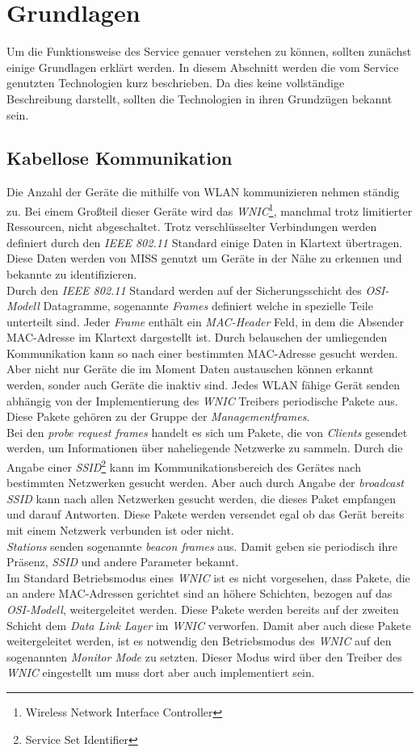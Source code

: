 \documentclass[]{report}
\begin{document}
\chapter{Grundlagen}
Um die Funktionsweise des Service genauer verstehen zu können, sollten zunächst einige Grundlagen erklärt werden. In diesem Abschnitt werden die vom Service genutzten Technologien kurz beschrieben. Da dies keine vollständige Beschreibung darstellt, sollten die Technologien in ihren Grundzügen bekannt sein. 
\section{Kabellose Kommunikation}
Die Anzahl der Geräte die mithilfe von WLAN kommunizieren nehmen ständig zu. Bei einem Großteil dieser Geräte wird das \textit{WNIC}\footnote{Wireless Network Interface Controller}, manchmal trotz limitierter Ressourcen, nicht abgeschaltet. Trotz verschlüsselter Verbindungen werden definiert durch den \textit{IEEE 802.11} Standard einige Daten in Klartext übertragen. Diese Daten werden von MISS genutzt um Geräte in der Nähe zu erkennen und bekannte zu identifizieren. \\
Durch den \textit{IEEE 802.11} Standard werden auf der Sicherungsschicht des \textit{OSI-Modell} Datagramme, sogenannte \textit{Frames} definiert welche in spezielle Teile unterteilt sind. Jeder \textit{Frame} enthält ein \textit{MAC-Header} Feld, in dem die Absender MAC-Adresse im Klartext dargestellt ist. Durch belauschen der umliegenden Kommunikation kann so nach einer bestimmten MAC-Adresse gesucht werden. \\
Aber nicht nur Geräte die im Moment Daten austauschen können erkannt werden, sonder auch Geräte die inaktiv sind. Jedes WLAN fähige Gerät senden abhängig von der Implementierung des \textit{WNIC} Treibers periodische Pakete aus. Diese Pakete gehören zu der Gruppe der \textit{Managementframes}. \\
Bei den \textit{probe request frames} handelt es sich um Pakete, die von \textit{Clients} gesendet werden, um Informationen über naheliegende Netzwerke zu sammeln. Durch die Angabe einer \textit{SSID}\footnote{Service Set Identifier} kann im Kommunikationsbereich des Gerätes nach bestimmten Netzwerken gesucht werden. Aber auch durch Angabe der \textit{broadcast SSID} kann nach allen Netzwerken gesucht werden, die dieses Paket empfangen und darauf Antworten. Diese Pakete werden versendet egal ob das Gerät bereits mit einem Netzwerk verbunden ist oder nicht.\\
\textit{Stations} senden sogenannte \textit{beacon frames} aus. Damit geben sie periodisch ihre Präsenz, \textit{SSID} und andere Parameter bekannt. \\
Im Standard Betriebsmodus eines \textit{WNIC} ist es nicht vorgesehen, dass Pakete, die an andere MAC-Adressen gerichtet sind an höhere Schichten, bezogen auf das \textit{OSI-Modell}, weitergeleitet werden. Diese Pakete werden bereits auf der zweiten Schicht dem \textit{Data Link Layer} im \textit{WNIC} verworfen. Damit aber auch diese Pakete weitergeleitet werden, ist es notwendig den Betriebsmodus des \textit{WNIC} auf den sogenannten \textit{Monitor Mode} zu setzten. Dieser Modus wird über den Treiber des \textit{WNIC} eingestellt um muss dort aber auch implementiert sein. 
\end{document}
